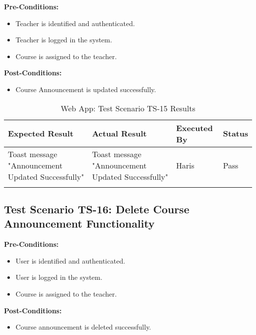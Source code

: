 \textbf{Pre-Conditions: }
\begin{itemize}

\item Teacher is identified and authenticated.
\item Teacher is logged in the system.
\item Course is assigned to the teacher.

\end{itemize}

\textbf{Post-Conditions: }
\begin{itemize}

\item Course Announcement is updated successfully.

\end{itemize}


\bigskip

\begin{longtable}{|p{4cm}|p{4cm}|p{2cm}|p{2cm}|}
\hline
\textbf{Expected Result} & \textbf{Actual Result} & \textbf{Executed By} & \textbf{Status}\\
\hline
Toast message "Announcement Updated Successfully" &
Toast message "Announcement Updated Successfully" &
Haris &
Pass \\
\hline

\caption{Web App: Test Scenario TS-15 Results}
\end{longtable}


\subsection{Test Scenario TS-16: Delete Course Announcement Functionality}

\textbf{Pre-Conditions: }
\begin{itemize}

\item User is identified and authenticated.
\item User is logged in the system.
\item Course is assigned to the teacher.

\end{itemize}

\textbf{Post-Conditions: }
\begin{itemize}

\item Course announcement is deleted successfully.

\end{itemize}


